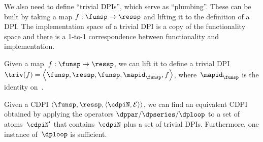 We also need to define ``trivial DPIs'', which serve as ``plumbing''.
These can be built by taking a map $f:\funsp\rightarrow\ressp$ and
lifting it to the definition of a DPI. The implementation space of
a trivial DPI is a copy of the functionality space and there is a
1-to-1 correspondence between functionality and implementation.
\begin{definition}
  Given a map~$f:\funsp\rightarrow\ressp$, we can lift it to define
  a trivial DPI $\triv(f)=\left\langle \funsp,\ressp,\funsp,\mapid_{\funsp},f\right\rangle $,
  where~$\mapid_{\funsp}$ is the identity on~\funsp.
\end{definition}
\begin{proposition}
  \label{prop:reduction}Given a CDPI $\left\langle \funsp,\ressp,\left\langle \cdpiN,\mathcal{E}\right\rangle \right\rangle $,
  we can find an equivalent CDPI obtained by applying the operators
  $\dppar/\dpseries/\dploop$ to a set of atoms~$\cdpiN'$ that contains~$\cdpiN$
  plus a set of trivial DPIs. Furthermore, one instance of~$\dploop$
  is sufficient.
\end{proposition}
